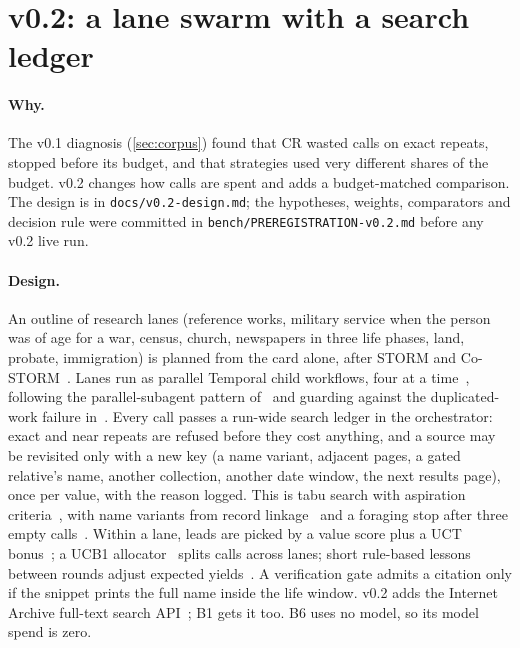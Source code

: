 \section{v0.2: a lane swarm with a search ledger}
\label{sec:swarm}

\paragraph{Why.} The v0.1 diagnosis (\cref{sec:corpus}) found that CR wasted calls on exact repeats, stopped before its budget, and that strategies used very different shares of the budget. v0.2 changes how calls are spent and adds a budget-matched comparison. The design is in \texttt{docs/v0.2-design.md}; the hypotheses, weights, comparators and decision rule were committed in \texttt{bench/PREREGISTRATION-v0.2.md} before any v0.2 live run.

\paragraph{Design.} An outline of research lanes (reference works, military service when the person was of age for a war, census, church, newspapers in three life phases, land, probate, immigration) is planned from the card alone, after STORM and Co-STORM~\cite{shao2024storm,jiang2024costorm}. Lanes run as parallel Temporal child workflows, four at a time~\cite{temporalpythonsdk}, following the parallel-subagent pattern of~\cite{anthropic2025multiagent} and guarding against the duplicated-work failure in~\cite{cemri2025mast}. Every call passes a run-wide search ledger in the orchestrator: exact and near repeats are refused before they cost anything, and a source may be revisited only with a new key (a name variant, adjacent pages, a gated relative's name, another collection, another date window, the next results page), once per value, with the reason logged. This is tabu search with aspiration criteria~\cite{glover1997tabu}, with name variants from record linkage~\cite{christen2012datamatching} and a foraging stop after three empty calls~\cite{pirolli1999foraging}. Within a lane, leads are picked by a value score plus a UCT bonus~\cite{kocsis2006uct,zhou2024lats}; a UCB1 allocator~\cite{auer2002ucb} splits calls across lanes; short rule-based lessons between rounds adjust expected yields~\cite{shinn2023reflexion}. A verification gate admits a citation only if the snippet prints the full name inside the life window. v0.2 adds the Internet Archive full-text search API~\cite{iafts}; B1 gets it too. B6 uses no model, so its model spend is zero.

